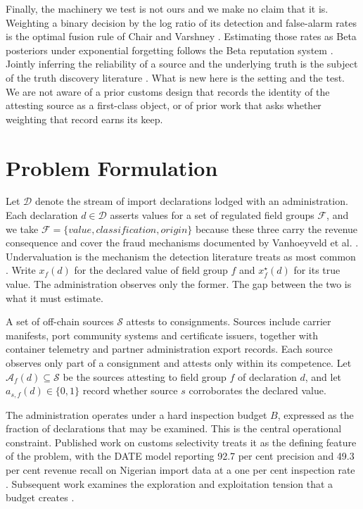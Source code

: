 \documentclass[information,article,submit,moreauthors]{Definitions/mdpi}
\begin{document}
Finally, the machinery we test is not ours and we make no claim that it is. Weighting a binary decision by the log ratio of its detection and false-alarm rates is the optimal fusion rule of Chair and Varshney \cite{chair1986fusion}. Estimating those rates as Beta posteriors under exponential forgetting follows the Beta reputation system \cite{josang2002beta}. Jointly inferring the reliability of a source and the underlying truth is the subject of the truth discovery literature \cite{li2014resolving,li2016truth}. What is new here is the setting and the test. We are not aware of a prior customs design that records the identity of the attesting source as a first-class object, or of prior work that asks whether weighting that record earns its keep.

\section{Problem Formulation}\label{sec:problem}

Let $\mathcal{D}$ denote the stream of import declarations lodged with an administration. Each declaration $d \in \mathcal{D}$ asserts values for a set of regulated field groups $\mathcal{F}$, and we take $\mathcal{F} = \{\textit{value}, \textit{classification}, \textit{origin}\}$ because these three carry the revenue consequence and cover the fraud mechanisms documented by Vanhoeyveld et al. \cite{vanhoeyveld2020imbalanced}. Undervaluation is the mechanism the detection literature treats as most common \cite{kim2020date}. Write $x_f(d)$ for the declared value of field group $f$ and $x_f^{\star}(d)$ for its true value. The administration observes only the former. The gap between the two is what it must estimate.

A set of off-chain sources $\mathcal{S}$ attests to consignments. Sources include carrier manifests, port community systems and certificate issuers, together with container telemetry and partner administration export records. Each source observes only part of a consignment and attests only within its competence. Let $\mathcal{A}_f(d) \subseteq \mathcal{S}$ be the sources attesting to field group $f$ of declaration $d$, and let $a_{s,f}(d) \in \{0,1\}$ record whether source $s$ corroborates the declared value.

The administration operates under a hard inspection budget $B$, expressed as the fraction of declarations that may be examined. This is the central operational constraint. Published work on customs selectivity treats it as the defining feature of the problem, with the DATE model reporting 92.7 per cent precision and 49.3 per cent revenue recall on Nigerian import data at a one per cent inspection rate \cite{kim2020date}. Subsequent work examines the exploration and exploitation tension that a budget creates \cite{kim2023activelearning}.
\end{document}
